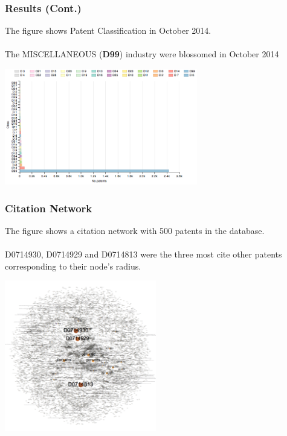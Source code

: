 \documentclass{beamer}
\begin{document}
\begin{frame}
\frametitle{Results (Cont.)}
The figure shows Patent Classification in October 2014.\\~\\
The MISCELLANEOUS (\textbf{D99}) industry were blossomed in October 2014
\begin{center}
\includegraphics[height=2in]{rplot-classification.png}
\end{center}
\end{frame}

\begin{frame}
\frametitle{Citation Network}
The figure shows a citation network with 500 patents in the database.\\~\\
D0714930, D0714929 and D0714813 were the three most cite other patents corresponding to their node's radius.
\begin{center}
\includegraphics[height=2.6in]{citation-label.png}
\end{center}
\end{frame}
\end{document}
